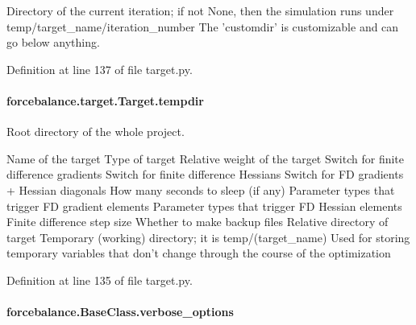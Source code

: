 Directory of the current iteration; if not None, then the simulation runs under temp/target\-\_\-name/iteration\-\_\-number The 'customdir' is customizable and can go below anything.

Definition at line 137 of file target.\-py.

\hypertarget{classforcebalance_1_1target_1_1Target_aa1f01b5b78db253b5b66384ed11ed193}{
\paragraph[{tempdir}]{\setlength{\rightskip}{0pt plus 5cm}forcebalance.\-target.\-Target.\-tempdir\hspace{0.3cm}{\ttfamily [inherited]}}}\label{classforcebalance_1_1target_1_1Target_aa1f01b5b78db253b5b66384ed11ed193}


Root directory of the whole project. 

Name of the target Type of target Relative weight of the target Switch for finite difference gradients Switch for finite difference Hessians Switch for F\-D gradients + Hessian diagonals How many seconds to sleep (if any) Parameter types that trigger F\-D gradient elements Parameter types that trigger F\-D Hessian elements Finite difference step size Whether to make backup files Relative directory of target Temporary (working) directory; it is temp/(target\-\_\-name) Used for storing temporary variables that don't change through the course of the optimization 

Definition at line 135 of file target.\-py.

\hypertarget{classforcebalance_1_1BaseClass_afd68efa29ccd2f320f4cf82198214aac}{
\paragraph[{verbose\-\_\-options}]{\setlength{\rightskip}{0pt plus 5cm}forcebalance.\-Base\-Class.\-verbose\-\_\-options\hspace{0.3cm}{\ttfamily [inherited]}}}\label{classforcebalance_1_1BaseClass_afd68efa29ccd2f320f4cf82198214aac}


